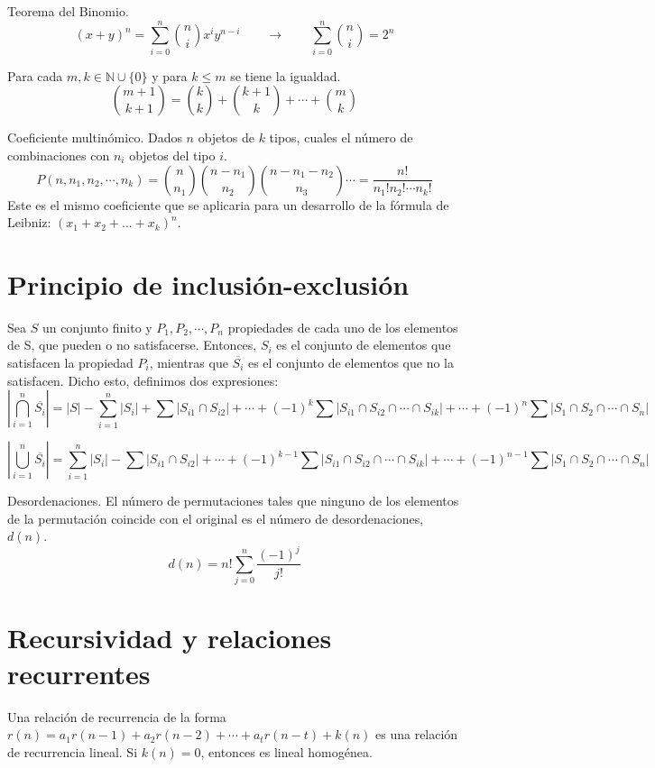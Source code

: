 \documentclass[a4paper]{article}
\begin{document}
\hrulefill

Teorema del Binomio.
$$(x+y)^n = \sum^{n}_{i=0} {n \choose i}x^iy^{n-i} \qquad \rightarrow \qquad \sum^{n}_{i=0} {n \choose i} =  2^n$$ 

\hrulefill

Para cada $m,k\in \mathbb{N}\cup\{0\}$ y para $k\le m$ se tiene la igualdad.
$${m+1 \choose k+1} = {k \choose k} + {k+1 \choose k} + \cdots + {m \choose k}$$


\hrulefill

Coeficiente multinómico. Dados $n$ objetos de $k$ tipos, cuales el número de combinaciones con $n_i$ objetos del tipo $i$.
$$P(n,n_1,n_2,\cdots,n_k) = {n \choose n_1}{n - n_1 \choose n_2}{n-n_1-n_2 \choose n_3}\cdots = \frac{n!}{n_1!n_2!\cdots n_k!}$$
Este es el mismo coeficiente que se aplicaria para un desarrollo de la fórmula de Leibniz: $(x_1+x_2+...+x_k)^n$.

\section*{Principio de inclusión-exclusión}
Sea $S$ un conjunto finito y $P_1, P_2, \cdots, P_n$ propiedades de cada uno de los elementos de S, que pueden o no satisfacerse. Entonces, $S_i$ es el conjunto de elementos que satisfacen la propiedad $P_i$, mientras que $\overline{S_i}$ es el conjunto de elementos que no la satisfacen. Dicho esto, definimos dos expresiones:
$$\left| \bigcap^n_{i=1}{\overline{S_i}}\right| = |S| - \sum^n_{i=1}|S_i| + \sum |S_{i1}\cap S_{i2}| + \cdots + (-1)^k \sum |S_{i1}\cap S_{i2}\cap \cdots \cap S_{ik}| + \cdots +  (-1)^n \sum |S_{1}\cap S_{2}\cap \cdots \cap S_{n}| $$

$$\left| \bigcup^n_{i=1}{\overline{S_i}}\right| = \sum^n_{i=1}|S_i| - \sum |S_{i1}\cap S_{i2}| + \cdots + (-1)^{k-1} \sum |S_{i1}\cap S_{i2}\cap \cdots \cap S_{ik}| + \cdots +  (-1)^{n-1} \sum |S_{1}\cap S_{2}\cap \cdots \cap S_{n}| $$

\hrulefill

Desordenaciones. El número de permutaciones tales que ninguno de los elementos de la permutación coincide con el original es el número de desordenaciones, $d(n)$.
$$d(n) = n! \sum_{j=0}^n\frac{(-1)^j}{j!}$$

\section*{Recursividad y relaciones recurrentes}
Una relación de recurrencia de la forma $r(n) = a_1r(n-1)+a_2r(n-2)+\cdots+a_tr(n-t)+k(n)$ es una relación de recurrencia lineal. Si $k(n) = 0$, entonces es lineal homogénea.
\end{document}
